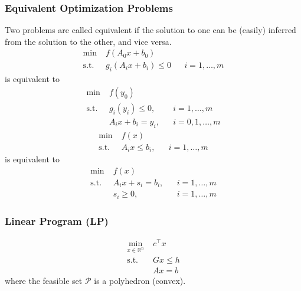 \subsubsection{Equivalent Optimization Problems}
Two problems are called equivalent if the solution to one can be (easily) inferred from the solution to the other, and vice versa.
\newpar{}
\begin{align*}
    \min\;           & f(A_0x + b_0)                               \\
    \mathrm{s.t.} \; & g_i(A_i x + b_i) \leq 0 &  & i = 1,\ldots,m
\end{align*}
is equivalent to
\begin{align*}
    \min\;          & f(y_0)                                   \\
    \mathrm{s.t.}\; & g_i(y_i) \leq 0,   &  & i = 1,\ldots,m   \\
                    & A_i x + b_i = y_i, &  & i = 0,1,\ldots,m
\end{align*}
\newpar{}
\begin{align*}
    \min\;          & f(x)                                \\
    \mathrm{s.t.}\; & A_i x \leq b_i, &  & i = 1,\ldots,m
\end{align*}
is equivalent to
\begin{align*}
    \min\;          & f(x)                                 \\
    \mathrm{s.t.}\; & A_i x +s_i= b_i, &  & i = 1,\ldots,m \\
                    & s_i \geq 0,      &  & i = 1,\ldots,m
\end{align*}

\subsubsection{Linear Program (LP)}\label{optimizer_location_LP}
\begin{align*}
    \min_{x\in\mathbb{R}^n}\; & c^\top x  \\
    \mathrm{s.t.}\;           & Gx \leq h \\
                              & Ax = b
\end{align*}
where the feasible set $\mathcal{P}$ is a polyhedron (convex).

